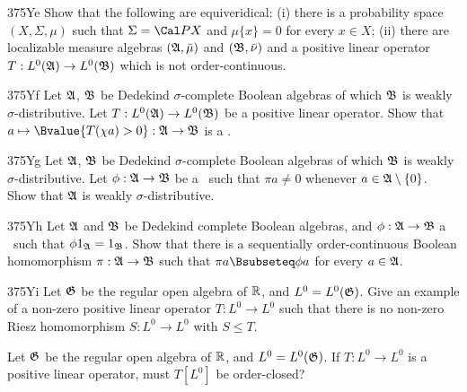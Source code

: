{\spheader 375Ye
Show that the following are equiveridical:
(i) there is a probability space $(X,\Sigma,\mu)$
such that $\Sigma=\Cal PX$ and $\mu\{x\}=0$ for every $x\in X$;
(ii) there are localizable measure algebras $(\frak A,\bar\mu)$ and
$(\frak B,\bar\nu)$ and a positive linear operator
$T:L^0(\frak A)\to L^0(\frak B)$
which is not order-continuous.

\spheader 375Yf
Let $\frak A$, $\frak B$ be Dedekind $\sigma$-complete Boolean algebras
of which $\frak B$ is weakly $\sigma$-distributive.   Let
$T:L^0(\frak A)\to L^0(\frak B)$ be a positive linear operator.   Show
that $a\mapsto\Bvalue{T(\chi a)>0}:\frak A\to\frak B$ is a
\ssbhm.

\spheader 375Yg
Let $\frak A$, $\frak B$ be Dedekind $\sigma$-complete Boolean algebras
of which $\frak B$ is weakly $\sigma$-distributive.   Let
$\phi:\frak A\to\frak B$ be a \ssbhm\ such that $\pi a\ne 0$ whenever
$a\in\frak A\setminus\{0\}$.   Show that $\frak A$ is weakly
$\sigma$-distributive.

\spheader 375Yh Let $\frak A$ and $\frak B$ be Dedekind complete Boolean
algebras, and $\phi:\frak A\to\frak B$ a \ssbhm\ such that
$\phi 1_{\frak A}=1_{\frak B}$.   Show that there
is a sequentially order-continuous Boolean homomorphism
$\pi:\frak A\to\frak B$ such that $\pi a\Bsubseteq\phi a$ for every
$a\in\frak A$.

\spheader 375Yi Let $\frak G$ be the regular open algebra of $\Bbb R$,
and $L^0=L^0(\frak G)$.   Give an example of a non-zero positive linear
operator $T:L^0\to L^0$ such that there is no non-zero Riesz homomorphism
$S:L^0\to L^0$ with $S\le T$.
}%

 Let $\frak G$ be the regular open algebra of
$\Bbb R$, and $L^0=L^0(\frak G)$.   If $T:L^0\to L^0$ is a positive
linear operator, must $T[L^0]$ be order-closed?


\discrpage



